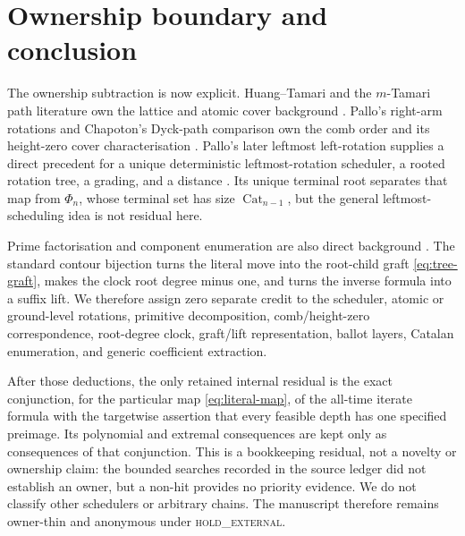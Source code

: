\documentclass[10pt,a4paper]{amsart}
\theoremstyle{definition}
\theoremstyle{remark}
\newcommand{\PhiMap}{\Phi}
\newcommand{\Cat}{\operatorname{Cat}}
\begin{document}
\section{Ownership boundary and conclusion}\label{sec:ownership}

The ownership subtraction is now explicit.  Huang--Tamari and the
$m$-Tamari path literature own the lattice and atomic cover background
\cite{HuangTamari1972Associativity,BousquetMelouFusyPrevilleRatelle2012Intervals}.
Pallo's right-arm rotations and Chapoton's Dyck-path comparison own the comb
order and its height-zero cover characterisation
\cite{Pallo2003RightArm,Chapoton2020DyckOrder}.  Pallo's later leftmost
left-rotation supplies a direct precedent for a unique deterministic
leftmost-rotation scheduler, a rooted rotation tree, a grading, and a distance
\cite{Pallo2006Rotational}.  Its unique terminal root separates that map from
$\PhiMap_n$, whose terminal set has size $\Cat_{n-1}$, but the general
leftmost-scheduling idea is not residual here.

Prime factorisation and component enumeration are also direct background
\cite{PanayotopoulosSapounakis2002Prime}.  The standard contour bijection
\cite{Stanley2015Catalan} turns the literal move into the root-child graft
\eqref{eq:tree-graft}, makes the clock root degree minus one, and turns the
inverse formula into a suffix lift.  We therefore assign zero separate credit
to the scheduler, atomic or ground-level rotations, primitive decomposition,
comb/height-zero correspondence, root-degree clock, graft/lift representation,
ballot layers, Catalan enumeration, and generic coefficient extraction.

After those deductions, the only retained internal residual is the exact
conjunction, for the particular map \eqref{eq:literal-map}, of the all-time
iterate formula with the targetwise assertion that every feasible depth has
one specified preimage.  Its polynomial and extremal consequences are kept
only as consequences of that conjunction.  This is a bookkeeping residual,
not a novelty or ownership claim: the bounded searches recorded in the source
ledger did not establish an owner, but a non-hit provides no priority evidence.
We do not classify other schedulers or arbitrary chains.  The manuscript
therefore remains owner-thin and anonymous under \textsc{hold\_external}.



\end{document}
